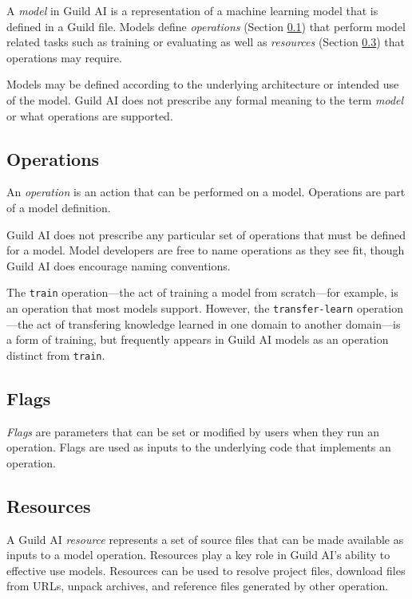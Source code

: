 \documentclass{article}
\begin{document}
A \emph{model} in Guild AI is a representation of a machine learning
model that is defined in a Guild file. Models define \emph{operations}
(Section \ref{sec:operations}) that perform model related tasks such
as training or evaluating as well as \emph{resources} (Section
\ref{sec:resources}) that operations may require.

Models may be defined according to the underlying architecture or
intended use of the model. Guild AI does not prescribe any formal
meaning to the term \emph{model} or what operations are supported.

\subsection{Operations}
\label{sec:operations}

An \emph{operation} is an action that can be performed on a
model. Operations are part of a model definition.

Guild AI does not prescribe any particular set of operations that must
be defined for a model. Model developers are free to name operations
as they see fit, though Guild AI does encourage naming conventions.

The \verb|train| operation---the act of training a model from
scratch---for example, is an operation that most models
support. However, the \verb|transfer-learn| operation---the act of
transfering knowledge learned in one domain to another domain---is a
form of training, but frequently appears in Guild AI models as an
operation distinct from \verb|train|.

\subsection{Flags}

\emph{Flags} are parameters that can be set or modified by users when
they run an operation. Flags are used as inputs to the underlying code
that implements an operation.

\subsection{Resources}
\label{sec:resources}

A Guild AI \emph{resource} represents a set of source files that can
be made available as inputs to a model operation. Resources play a key
role in Guild AI's ability to effective use models. Resources can be
used to resolve project files, download files from URLs, unpack
archives, and reference files generated by other operation.
\end{document}
